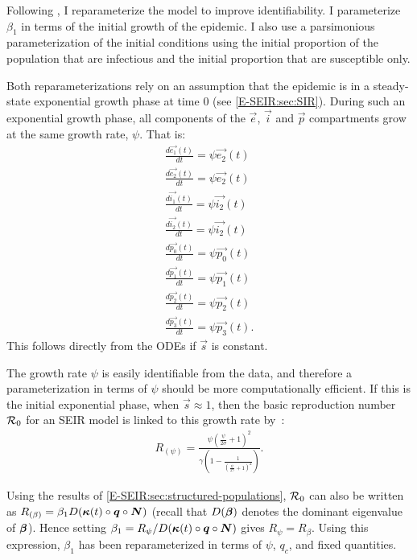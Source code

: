 \documentclass[thesis.tex]{subfiles}
\begin{document}
Following \textcite{birrellBayesian}, I reparameterize the model to improve identifiability.
I parameterize $\beta_1$ in terms of the initial growth of the epidemic.
I also use a parsimonious parameterization of the initial conditions using the initial proportion of the population that are infectious and the initial proportion that are susceptible only.

Both reparameterizations rely on an assumption that the epidemic is in a steady-state exponential growth phase at time 0 (see \cref{E-SEIR:sec:SIR}). During such an exponential growth phase, all components of the $\vec{e}$, $\vec{i}$ and $\vec{p}$ compartments grow at the same growth rate, $\psi$.
That is:
\begin{equation}
\begin{aligned}
\frac{d\vec{e_1}(t)}{dt} = \psi \vec{e_2}(t) \\
\frac{d\vec{e_2}(t)}{dt} = \psi \vec{e_2}(t) \\
\frac{d\vec{i_1}(t)}{dt} = \psi \vec{i_2}(t) \\
\frac{d\vec{i_2}(t)}{dt} = \psi \vec{i_2}(t) \\
\frac{d\vec{p_0}(t)}{dt} = \psi \vec{p_0}(t) \\
\frac{d\vec{p_1}(t)}{dt} = \psi \vec{p_1}(t) \\
\frac{d\vec{p_2}(t)}{dt} = \psi \vec{p_2}(t) \\
\frac{d\vec{p_3}(t)}{dt} = \psi \vec{p_3}(t).
\end{aligned}
\label{SEIR:eq:exponential-growth}
\end{equation}
This follows directly from the ODEs if $\vec{s}$ is constant. 

The growth rate $\psi$ is easily identifiable from the data, and therefore a parameterization in terms of $\psi$ should be more computationally efficient.
If this is the initial exponential phase, when $\vec{s} \approx 1$, then the basic reproduction number $\mathcal{R}_{0}$ for an SEIR model is linked to this growth rate by~\autocite{birrellBayesian,wearingAppropriate}:
\begin{align}
    R_{(\psi)} = \frac{\psi \left( \frac{\psi}{2\sigma} + 1 \right)^2}{\gamma \left(1 - \frac{1}{\left(\frac{\psi}{2 \gamma} + 1 \right)^2} \right)} \label{SEIR:eq:rtoR}.
\end{align}

Using the results of \cref{E-SEIR:sec:structured-populations}, $\mathcal{R}_{0}$ can also be written as $R_{(\beta)} = \beta_1 D(\bm{\kappa}(t) \circ \bm{q} \circ \bm{N})$ (recall that $D(\bm{\beta})$ denotes the dominant eigenvalue of $\bm{\beta}$).
Hence setting $\beta_1 = R_\psi / D(\bm{\kappa}(t) \circ \bm{q} \circ \bm{N})$ gives $R_\psi = R_\beta$.
Using this expression, $\beta_1$ has been reparameterized in terms of $\psi$, $q_c$, and fixed quantities.
\end{document}
